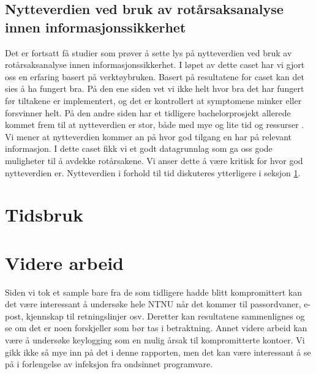 \subsection{Nytteverdien ved bruk av rotårsaksanalyse innen informasjonssikkerhet}
Det er fortsatt få studier som prøver å sette lys på nytteverdien ved bruk av rotårsaksanalyse innen informasjonssikkerhet. I løpet av dette caset har vi gjort oss en erfaring basert på verktøybruken. Basert på resultatene for caset kan det sies å ha fungert bra. På den ene siden vet vi ikke helt hvor bra det har fungert før tiltakene er implementert, og det er kontrollert at symptomene minker eller forsvinner helt. På den andre siden har et tidligere bachelorprosjekt allerede kommet frem til at nytteverdien er stor, både med mye og lite tid og ressurser \cite{RCARapport}. Vi mener at nytteverdien kommer an på hvor god tilgang en har på relevant informasjon. I dette caset fikk vi et godt datagrunnlag som ga oss gode muligheter til å avdekke rotårsakene. Vi anser dette å være kritisk for hvor god nytteverdien er. Nytteverdien i forhold til tid diskuteres ytterligere i seksjon \ref{sek:tidsbruk_case2}. 

\section{Tidsbruk}
\label{sek:tidsbruk_case2}


\section{Videre arbeid}
Siden vi tok et sample bare fra de som tidligere hadde blitt kompromittert kan det være interessant å undersøke hele NTNU når det kommer til passordvaner, e-post, kjennskap til retningslinjer osv. Deretter kan resultatene sammenlignes og se om det er noen forskjeller som bør tas i betraktning. Annet videre arbeid kan være å undersøke keylogging som en mulig årsak til kompromitterte kontoer. Vi gikk ikke så mye inn på det i denne rapporten, men det kan være interessant å se på i forlengelse av infeksjon fra ondsinnet programvare. 